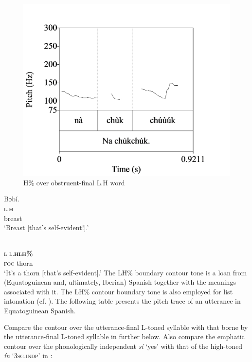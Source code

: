 \begin{figure}
\caption{H\% over obstruent-final L.H word}
\label{fig:key:3.34}
\includegraphics[height=.3\textheight]{figures/yakpomod-img36.png}
\end{figure}

\ea%
    \label{ex:key:86}
    \glll   Bɔbí.\\
\textsc{l.}\textbf{\textsc{h}}\\
breast\\
\glt ‘Breast [that’s self-evident!].’ 
\z

\ea
\label{ex:key:87}
\glll {}\\
\textsc{l}  \textsc{l.}\textbf{\textsc{hlh\%}}\\
\textsc{foc}  thorn\\
\glt ‘It’s a thorn [that’s self-evident].’
\z
The LH\% boundary contour tone is a loan from (Equatoguinean and, ultimately, Iberian) Spanish together with the meanings associated with it. The LH\% contour boundary tone is also employed for list intonation (cf. ). The following table presents the pitch trace of an utterance in Equatoguinean Spanish.


Compare the contour over the utterance-final L-toned syllable with that borne by the utterance-final L-toned syllable in  further below. Also compare the emphatic contour over the phonologically independent \textit{sí} ‘yes’ with that of the high-toned \textit{ín} ‘\textsc{3sg.indp}’ in :


